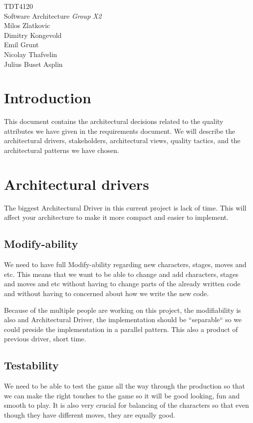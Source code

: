


{\LARGE TDT4120 \\ \large Software Architecture}
{{\large\emph{Group X2}}\\[0.2cm]
	Milos Zlatkovic \\
	Dimitry Kongevold \\
	Emil Grunt\\
	Nicolay Thafvelin\\
	Julius Buset Asplin\\
}
\tableofcontents
\chapter{Introduction}
This document contains the architectural decisions related to the quality attributes we have given in the requirements document. We will describe the architectural drivers, stakeholders, architectural views, quality tactics, and the architectural patterns we have chosen.

\chapter{Architectural drivers}
The biggest Architectural Driver in this current project is lack of time. This will affect your architecture to make it more compact and easier to implement.

\section{Modify-ability}
We need to have full Modify-ability regarding new characters, stages, moves and etc. This means that we want to be able to change and add characters, stages and moves and etc without having to change parts of the already written code and without having to concerned about how we write the new code.

Because of the multiple people are working on this project, the modifiability is also and Architectural Driver, the implementation should be “separable“ so we could preside the implementation in a parallel pattern. This also a product of previous driver, short time.

\section{Testability}
We need to be able to test the game all the way through the production so that we can make the right touches to the game so it will be good looking, fun and smooth to play. It is also very crucial for balancing of the characters so that even though they have different moves, they are equally good.

